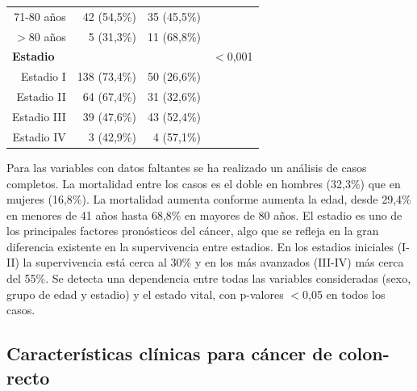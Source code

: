 \begin{table}[H]
\begin{tabular}{rrrc}
		71-80 años                                     & 42 (54,5\%)               & 35 (45,5\%)                 &                                          \\
		$>$80 años                                   & 5 (31,3\%)                & 11 (68,8\%)                 &                                          \\ \hline
		\multicolumn{1}{l}{\textbf{Estadio}}           &                           &                             & $<$0,001                         \\
		Estadio I                                      & 138 (73,4\%)              & 50 (26,6\%)                 &                                          \\
		Estadio II                                     & 64 (67,4\%)               & 31 (32,6\%)                 &                                          \\
		Estadio III                                    & 39 (47,6\%)               & 43 (52,4\%)                 &                                          \\
		Estadio IV                                     & 3 (42,9\%)                & 4 (57,1\%)                  &                                          \\ \hline
	\end{tabular}
\end{table}

Para las variables con datos faltantes se ha realizado un análisis de casos completos.  La mortalidad entre los casos es el doble en hombres (32,3\%) que en mujeres (16,8\%). La mortalidad aumenta conforme aumenta la edad, desde 29,4\% en menores de 41 años hasta 68,8\% en mayores de 80 años. El estadio es uno de los principales factores pronósticos del cáncer, algo que se refleja en la gran diferencia existente en la supervivencia entre estadios. En los estadios iniciales (I-II) la supervivencia está cerca al 30\% y en los más avanzados (III-IV) más cerca del 55\%. Se detecta una dependencia entre todas las variables consideradas (sexo, grupo de edad y estadio)  y el estado vital, con p-valores $<$0,05 en todos los casos.

\subsection{Características clínicas para cáncer de colon-recto}

